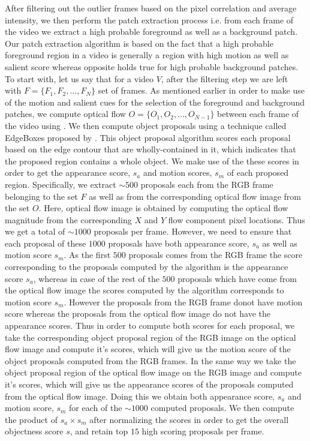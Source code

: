 \documentclass[10pt,twocolumn,letterpaper]{article}
\begin{document}
After filtering out the outlier frames based on the pixel correlation and average intensity, we then perform the patch extraction process i.e. from each frame of the video we extract a high probable foreground as well as a background patch. Our patch extraction algorithm is based on the fact that a high probable foreground region in a video is generally a region with high motion as well as salient score whereas opposite holds true for high probable background patches. To start with, let us say that for a video $V$, after the filtering step we are left with $F=\{F_{1}, F_{2},...,F_{N}\}$ set of frames. As mentioned earlier in order to make use of the motion and salient cues for the selection of the foreground and background patches, we compute optical flow $O=\{O_{1}, O_{2},...,O_{N-1}\}$ between each frame of the video using \cite{liu2009beyond}. We then compute object proposals using a technique called EdgeBoxes proposed by \cite{ZitnickECCV14edgeBoxes}. This object proposal algorithm scores each proposal based on the edge contour that are wholly-contained in it, which indicates that the proposed region contains a whole object. We make use of the these scores in order to get the appearance score, $s_{a}$ and motion scores, $s_{m}$ of each proposed region. Specifically, we extract $\sim500$ proposals each from the RGB frame belonging to the set $F$ as well as from the corresponding optical flow image from the set $O$. Here, optical flow image is obtained by computing the optical flow magnitude from the corresponding $X$ and $Y$ flow component pixel locations. Thus we get a total of $\sim1000$ proposals per frame. However, we need to ensure that each proposal of these $1000$ proposals have both appearance score, $s_{a}$ as well as motion score $s_{m}$. As the first $500$ proposals comes from the RGB frame the score corresponding to the proposals computed by the algorithm is the appearance score $s_{a}$, whereas in case of the rest of the $500$ proposals which have come from the optical flow image the scores computed by the algorithm corresponds to motion score $s_{m}$. However the proposals from the RGB frame donot have motion score whereas the proposals from the optical flow image do not have the appearance scores. Thus in order to compute both scores for each proposal, we take the corresponding object proposal region of the RGB image on the optical flow image and compute it's scores, which will give us the motion score of the object proposals computed from the RGB frames. In the same way we take the object proposal region of the optical flow image on the RGB image and compute it's scores, which will give us the appearance scores of the proposals computed from the optical flow image. Doing this we obtain both appearance score, $s_{a}$ and motion score, $s_{m}$ for each of the $\sim1000$ computed proposals. We then compute the product of $s_{a}\times s_{m}$ after normalizing the scores in order to get the overall objectness score $s$, and retain top $15$ high scoring proposals per frame.
\end{document}
